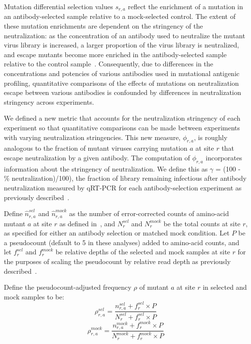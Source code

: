 \documentclass[11pt]{article}
\begin{document}
Mutation differential selection values $s_{r,a}$ reflect the enrichment of a mutation in an antibody-selected sample relative to a mock-selected control. 
The extent of these mutation enrichments are dependent on the stringency of the neutralization: as the concentration of an antibody used to neutralize the mutant virus library is increased, a larger proportion of the virus library is neutralized, and escape mutants become more enriched in the antibody-selected sample relative to the control sample~\cite{doud2017complete}.
Consequently, due to differences in the concentrations and potencies of various antibodies used in mutational antigenic profiling, quantitative comparisons of the effects of mutations on neutralization escape between various antibodies is confounded by differences in neutralization stringency across experiments.

We defined a new metric that accounts for the neutralization stringency of each experiment so that quantitative comparisons can be made between experiments with varying neutralization stringencies.
This new measure, $\phi_{r,a}$, is roughly analogous to the fraction of mutant viruses carrying mutation $a$ at site $r$ that escape neutralization by a given antibody.
The computation of $\phi_{r,a}$ incorporates information about the stringency of neutralization. 
We define this as  $\gamma$ = (100 - \% neutralization)/100), the fraction of library remaining infectious after antibody neutralization measured by qRT-PCR for each antibody-selection experiment as previously described~\cite{doud2017complete}.

Define $\hat{n}_{r,a}^{sel}$ and $\hat{n}_{r,a}^{mock}$ as the number of error-corrected counts of amino-acid mutant $a$ at site $r$ as defined in~\cite{doud2017complete}, and $N_r^{sel}$ and $N_r^{mock}$ be the total counts at site $r$, as specified for either an antibody selection or matched mock condition.
Let $P$ be a pseudocount (default to 5 in these analyses) added to amino-acid counts, and let $f_{r}^{sel}$ and $f_{r}^{mock}$ be relative depths of the selected and mock samples at site $r$ for the purposes of scaling the pseudocount by relative read depth as previously described~\cite{doud2017complete}.

Define the pseudocount-adjusted frequency $\rho$ of mutant $a$ at site $r$ in selected and mock samples to be:
$$\rho_{r,a}^{sel} = \frac{n_{r,a}^{sel}+f_r^{sel}\times P}{N_r^{sel}+f_r^{sel}\times  P}$$
$$\rho_{r,a}^{mock} = \frac{n_{r,a}^{mock}+f_r^{mock}\times P}{N_r^{mock}+f_r^{mock}\times  P}$$
\end{document}

